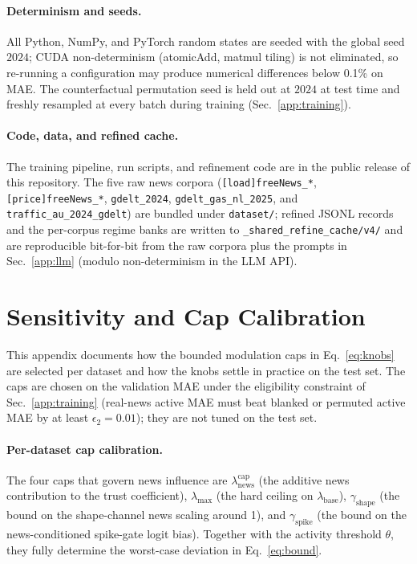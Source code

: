 \documentclass{article}
\begin{document}
\paragraph{Determinism and seeds.}
All Python, NumPy, and PyTorch random states are seeded with the global seed $2024$; CUDA non-determinism (atomicAdd, matmul tiling) is not eliminated, so re-running a configuration may produce numerical differences below 0.1\% on MAE. The counterfactual permutation seed is held out at $2024$ at test time and freshly resampled at every batch during training (Sec.~\ref{app:training}).

\paragraph{Code, data, and refined cache.}
The training pipeline, run scripts, and refinement code are in the public release of this repository. The five raw news corpora (\texttt{[load]freeNews\_*}, \texttt{[price]freeNews\_*}, \texttt{gdelt\_2024}, \texttt{gdelt\_gas\_nl\_2025}, and \texttt{traffic\_au\_2024\_gdelt}) are bundled under \texttt{dataset/}; refined JSONL records and the per-corpus regime banks are written to \texttt{\_shared\_refine\_cache/v4/} and are reproducible bit-for-bit from the raw corpora plus the prompts in Sec.~\ref{app:llm} (modulo non-determinism in the LLM API).

\section{Sensitivity and Cap Calibration}
\label{app:sensitivity}

This appendix documents how the bounded modulation caps in Eq.~\ref{eq:knobs} are selected per dataset and how the knobs settle in practice on the test set. The caps are chosen on the validation MAE under the eligibility constraint of Sec.~\ref{app:training} (real-news active MAE must beat blanked or permuted active MAE by at least $\epsilon_2{=}0.01$); they are not tuned on the test set.

\paragraph{Per-dataset cap calibration.}
The four caps that govern news influence are $\lambda_{\text{news}}^{\text{cap}}$ (the additive news contribution to the trust coefficient), $\lambda_{\max}$ (the hard ceiling on $\lambda_{\text{base}}$), $\gamma_{\text{shape}}$ (the bound on the shape-channel news scaling around 1), and $\gamma_{\text{spike}}$ (the bound on the news-conditioned spike-gate logit bias). Together with the activity threshold $\theta$, they fully determine the worst-case deviation in Eq.~\ref{eq:bound}.
\end{document}
